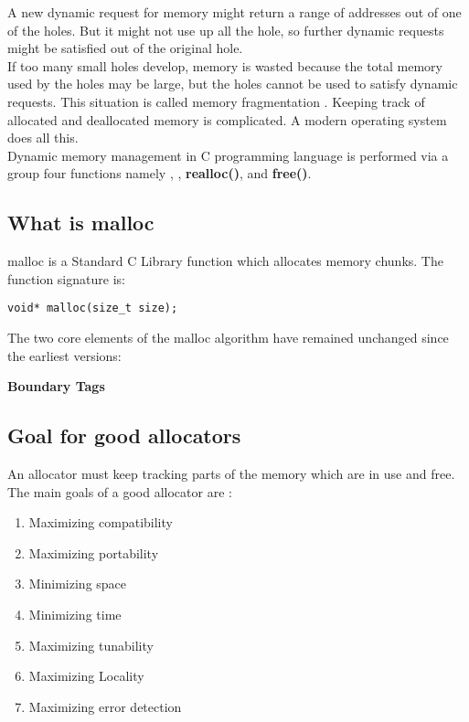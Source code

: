 A new dynamic request for memory might return a range of addresses out of one of the holes. But it might not use up all the hole, so further dynamic requests might be satisfied out of the original hole.\\

If too many small holes develop, memory is wasted because the total memory used by the holes may be large, but the holes cannot be used to satisfy dynamic requests. This situation is called memory fragmentation \cite{Knuth73a}. Keeping track of allocated and deallocated memory is complicated. A modern operating system does all this.\\

Dynamic memory management in C programming language is performed via a group four functions namely , , \textbf{realloc()}, and \textbf{free()}.

\subsection{What is malloc}
malloc is a Standard C Library function which allocates memory chunks.
The function signature is:
\begin{lstlisting}
void* malloc(size_t size);
\end{lstlisting}

The two core elements of the malloc algorithm have remained unchanged since the earliest versions:

\textbf{Boundary Tags}


\subsection{Goal for good allocators}
An allocator must keep tracking parts of the memory which are in use and free.
The main goals of a good allocator are \cite{Lea12}:
\begin{enumerate}
\item Maximizing compatibility\\

\item Maximizing portability

\item Minimizing space

\item Minimizing time
\item Maximizing tunability
\item Maximizing Locality
\item Maximizing error detection
\end{enumerate}
